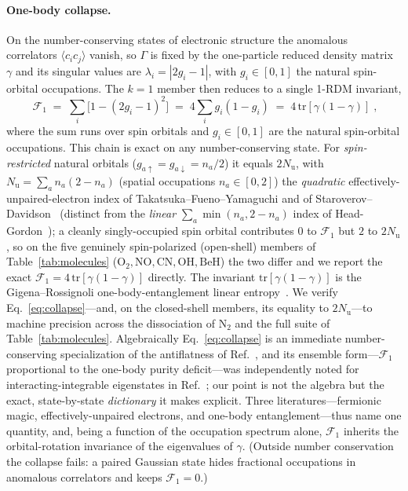 \paragraph{One-body collapse.} On the number-conserving states of electronic structure the anomalous
correlators $\langle c_ic_j\rangle$ vanish, so $\Gamma$ is fixed by the one-particle reduced density matrix
$\gamma$ and its singular values are $\lambda_i=|2g_i-1|$, with $g_i\in[0,1]$ the natural
spin-orbital occupations. The $k=1$ member then reduces to a single 1-RDM invariant,
\begin{equation}
\boxed{\;\mathcal F_1 \;=\; \sum_i\bigl[1-(2g_i-1)^2\bigr] \;=\; 4\sum_i g_i(1-g_i)
\;=\; 4\,\mathrm{tr}[\gamma(1-\gamma)]\;,}
\label{eq:collapse}
\end{equation}
where the sum runs over spin orbitals and $g_i\in[0,1]$ are the natural spin-orbital occupations. This
chain is exact on any number-conserving state. For \emph{spin-restricted} natural orbitals
($g_{a\uparrow}=g_{a\downarrow}=n_a/2$) it equals $2N_{\mathrm u}$, with
$N_{\mathrm u}=\sum_a n_a(2-n_a)$ (spatial occupations $n_a\in[0,2]$) the \emph{quadratic}
effectively-unpaired-electron index of Takatsuka--Fueno--Yamaguchi and of
Staroverov--Davidson~\cite{takatsuka1978,staroverov2000} (distinct from the \emph{linear}
$\sum_a\min(n_a,2-n_a)$ index of Head-Gordon~\cite{headgordon2003}); a cleanly singly-occupied spin
orbital contributes $0$ to $\mathcal F_1$ but $2$ to $2N_{\mathrm u}$, so on the five genuinely
spin-polarized (open-shell) members of Table~\ref{tab:molecules} ($\mathrm{O_2},\mathrm{NO},\mathrm{CN},
\mathrm{OH},\mathrm{BeH}$) the two differ and we report the exact
$\mathcal F_1=4\,\mathrm{tr}[\gamma(1-\gamma)]$ directly. The invariant $\mathrm{tr}[\gamma(1-\gamma)]$ is
the Gigena--Rossignoli one-body-entanglement linear entropy~\cite{gigena2020}. We verify
Eq.~\eqref{eq:collapse}---and, on the closed-shell members, its equality to $2N_{\mathrm u}$---to machine
precision across the dissociation of $\mathrm{N_2}$ and the full suite of Table~\ref{tab:molecules}. Algebraically Eq.~\eqref{eq:collapse} is an immediate
number-conserving specialization of the antiflatness of Ref.~\cite{sierant2026}, and its ensemble
form---$\mathcal F_1$ proportional to the one-body purity deficit---was independently noted for
interacting-integrable eigenstates in Ref.~\cite{swietek2026}; our point is not the algebra but the
exact, state-by-state \emph{dictionary} it makes explicit. Three literatures---fermionic magic,
effectively-unpaired electrons, and one-body entanglement---thus name one quantity, and, being a
function of the occupation spectrum alone, $\mathcal F_1$ inherits the orbital-rotation invariance of
the eigenvalues of $\gamma$. (Outside
number conservation the collapse fails: a paired Gaussian state hides fractional occupations in
anomalous correlators and keeps $\mathcal F_1=0$.)

